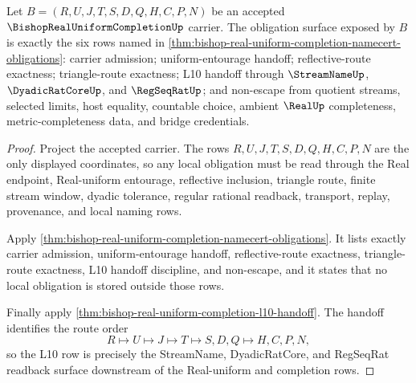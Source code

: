 \begin{theorem}
\label{thm:bishop-real-uniform-completion-obligation-rows}
Let $B=(R,U,J,T,S,D,Q,H,C,P,N)$ be an accepted $\BishopRealUniformCompletionUp$ carrier. The obligation surface exposed by $B$ is exactly the six rows named in \autoref{thm:bishop-real-uniform-completion-namecert-obligations}: carrier admission; uniform-entourage handoff; reflective-route exactness; triangle-route exactness; L10 handoff through $\StreamNameUp$, $\DyadicRatCoreUp$, and $\RegSeqRatUp$; and non-escape from quotient streams, selected limits, host equality, countable choice, ambient $\RealUp$ completeness, metric-completeness data, and bridge credentials.
\end{theorem}
\begin{proof}
Project the accepted carrier. The rows $R,U,J,T,S,D,Q,H,C,P,N$ are the only displayed coordinates, so any local obligation must be read through the Real endpoint, Real-uniform entourage, reflective inclusion, triangle route, finite stream window, dyadic tolerance, regular rational readback, transport, replay, provenance, and local naming rows.

Apply \autoref{thm:bishop-real-uniform-completion-namecert-obligations}. It lists exactly carrier admission, uniform-entourage handoff, reflective-route exactness, triangle-route exactness, L10 handoff discipline, and non-escape, and it states that no local obligation is stored outside those rows.

Finally apply \autoref{thm:bishop-real-uniform-completion-l10-handoff}. The handoff identifies the route order
$$
R\longmapsto U\longmapsto J\longmapsto T\longmapsto S,D,Q\longmapsto H,C,P,N ,
$$
so the L10 row is precisely the StreamName, DyadicRatCore, and RegSeqRat readback surface downstream of the Real-uniform and completion rows.
\end{proof}

